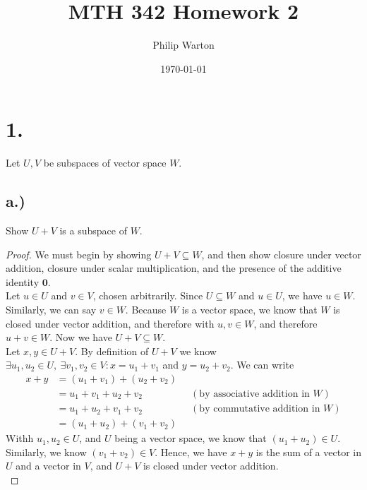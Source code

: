 \documentclass{article}
\begin{document}
\title{MTH 342 Homework 2}
\author{Philip Warton}
\date{\today}
\maketitle

\section*{1.}
	
	Let $U, V$ be subspaces of vector space $W$.
	\subsection*{a.)}
	
	Show $U + V$ is a subspace  of $W$.
	
	\begin{proof}
		We must begin by showing $U + V \subseteq W$, and then show closure under vector addition, closure under scalar multiplication, and the presence of the additive identity $\mathbf{0}$. \\
		
		Let $u \in U$ and $v \in V$, chosen arbitrarily. Since $U \subseteq W$ and $u \in U$, we have $u \in W$. Similarly, we can say $v \in W$. Because $W$ is a vector space, we know that $W$ is closed under vector addition, and therefore with $u,v \in W$, and therefore $u + v \in W$. Now we have $U + V \subseteq W$.\\
		
		Let $x, y \in U + V$. By definition of $U + V$ we know $\exists u_1, u_2 \in U, \ \exists v_1, v_2 \in V : x = u_1 + v_1$ and $y = u_2 + v_2$. We can write 
		\begin{align*}
		x + y & = (u_1 + v_1) + (u_2 + v_2) \\
		& = u_1 + v_1 + u_2 + v_2 \ \ \ \ \ \ \ \ \ \ \ \ \ \ \ \ \ \ \ \ \ \ ( \text{by associative addition in } W)\\
		& = u_1 + u_2 + v_1 + v_2 \ \ \ \ \ \ \ \ \ \ \ \ \ \ \ \ \ \ \ \ \ \ (\text{by commutative addition in } W)\\
		& = (u_1 + u_2) + (v_1 + v_2)
		\end{align*}
		Withh $u_1, u_2 \in U$, and $U$ being a vector space, we know that $(u_1 + u_2) \in U$. Similarly, we know $(v_1 + v_2) \in V$. Hence, we have $x + y$ is the sum of a vector in $U$ and a vector in $V$, and $U + V$ is closed under vector addition.\\
		

\end{proof}
\end{document}
